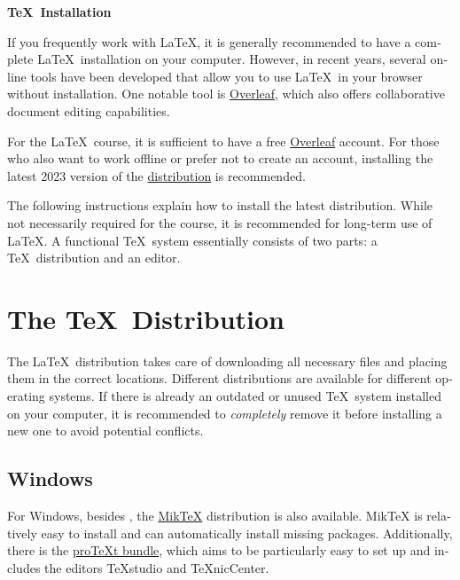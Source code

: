 \documentclass[
	ausgabe=2024-02-12,
	titel=Installation\ Instructions,
	shortverb=true,
	englisch=true,
]{../tex/latexkurs-exercise}
\begin{document}
\begin{center}
\sffamily\bfseries\Large \TeX\ Installation
\end{center}
\begin{english}

\noindent If you frequently work with \LaTeX, it is generally recommended to have a complete \LaTeX\ installation on your computer. However, in recent years, several online tools have been developed that allow you to use \LaTeX\ in your browser without installation. One notable tool is \href{https://qn3.de/tex00}{Overleaf}, which also offers collaborative document editing capabilities.

For the \LaTeX\ course, it is sufficient to have a free \href{https://qn3.de/tex00}{Overleaf} account. For those who also want to work offline or prefer not to create an account, installing the latest 2023 version of the \href{https://www.tug.org/texlive/}{\TeXlive distribution} is recommended.

The following instructions explain how to install the latest \TeXlive distribution. While not necessarily required for the course, it is recommended for long-term use of \LaTeX. A functional \TeX\ system essentially consists of two parts: a \TeX\ distribution and an editor.

\section{The \TeX\ Distribution}

The \LaTeX\ distribution takes care of downloading all necessary files and placing them in the correct locations. Different distributions are available for different operating systems. If there is already an outdated or unused \TeX\ system installed on your computer, it is recommended to \emph{completely} remove it before installing a new one to avoid potential conflicts.

\subsection*{Windows}
For Windows, besides \href{https://www.tug.org/texlive/}{\TeXlive}, the \href{https://miktex.org/}{MikTeX} distribution is also available. MikTeX is relatively easy to install and can automatically install missing packages. Additionally, there is the \href{https://www.tug.org/protext/}{pro\TeX t bundle}, which aims to be particularly easy to set up and includes the editors TeXstudio and TeXnicCenter.


\end{english}
\end{document}
